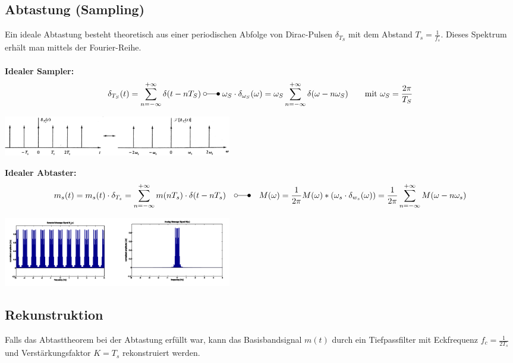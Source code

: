 \subsection{Abtastung (Sampling)}
	Ein ideale Abtastung besteht theoretisch aus einer periodischen Abfolge von Dirac-Pulsen
	$\delta_{T_S}$ mit dem Abstand $T_s = \frac{1}{f_s}$. Dieses Spektrum erhält man mittels der Fourier-Reihe. \\ \\
	\textbf{Idealer Sampler:}
	$$\delta_{T_S}(t) = \sum\limits_{n=-\infty}^{+\infty} \delta(t-nT_S) \; \laplace \; \omega_S \cdot \delta_{\omega_S} (\omega) = \omega_S \sum\limits_{n=-\infty}^{+\infty} \delta(\omega - n \omega_S) \qquad \text{mit  } \omega_S = \frac{2\pi}{T_S}$$
	\begin{center}
		\includegraphics[width=10cm]{bilder/dig_sampler_ideal.png}
	\end{center}

	\textbf{Idealer Abtaster:}
	\begin{equation*}
		 m_s(t) = m_s(t) \cdot \delta_{T_s} = \sum_{n=-\infty}^{+\infty} m(nT_s) \cdot \delta(t-nT_s) \quad \laplace \quad
		M(\omega) = \frac{1}{2\pi}M(\omega)\ast (\omega_s\cdot\delta_{w_s}(\omega)) = \frac{1}{2\pi} \sum_{n=-\infty}^{+\infty}M(\omega-n\omega_s)
	\end{equation*}
	\begin{center}
			\includegraphics[width=10cm]{bilder/dig_abtaster_ideal_spektrum.png}
		\end{center}
\subsection{Rekunstruktion}
Falls das Abtasttheorem bei der Abtastung erf\"ullt war, kann das Basisbandsignal $m(t)$ durch ein Tiefpassfilter mit Eckfrequenz $f_c = \frac{1}{2T_s}$ und Verst\"arkungsfaktor $K=T_s$ rekonstruiert werden.  


